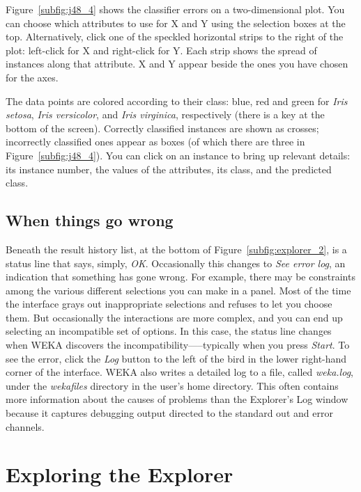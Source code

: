 Figure~\ref{subfig:j48_4} shows the classifier errors on a
two-dimensional plot. You can choose which attributes to use for X and
Y using the selection boxes at the top. Alternatively, click one of
the speckled horizontal strips to the right of the plot: left-click
for X and right-click for Y. Each strip shows the spread of instances
along that attribute. X and Y appear beside the ones you have chosen
for the axes.

The data points are colored according to their class: blue, red and
green for \textit{Iris setosa}, \textit{Iris versicolor}, and
\textit{Iris virginica}, respectively (there is a key at the bottom of
the screen). Correctly classified instances are shown as crosses;
incorrectly classified ones appear as boxes (of which there are three
in Figure~\ref{subfig:j48_4}). You can click on an instance to bring
up relevant details: its instance number, the values of the
attributes, its class, and the predicted class.

\subsection{When things go wrong}

Beneath the result history list, at the bottom of
Figure~\ref{subfig:explorer_2}, is a status line that says, simply,
\textit{OK}. Occasionally this changes to \textit{See error log}, an
indication that something has gone wrong. For example, there may be
constraints among the various different selections you can make in a
panel. Most of the time the interface grays out inappropriate
selections and refuses to let you choose them. But occasionally the
interactions are more complex, and you can end up selecting an
incompatible set of options. In this case, the status line changes
when WEKA discovers the incompatibility—--typically when you press
\textit{Start}. To see the error, click the \textit{Log} button to the
left of the bird in the lower right-hand corner of the interface. WEKA
also writes a detailed log to a file, called \textit{weka.log}, under
the \textit{wekafiles} directory in the user's home directory. This
often contains more information about the causes of problems than the
Explorer's Log window because it captures debugging output directed to
the standard out and error channels.

\section{Exploring the Explorer}
\label{section:exploring_the_explorer}

